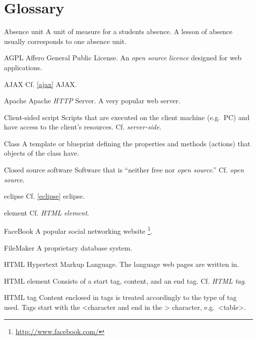 \documentclass[12pt,a4paper,twoside,openany]{report}
\begin{document}
\chapter{Glossary}
\label{glossary}
\begin{basedescript}{}

\item[Absence unit] A unit of measure for a students absence. A lesson of
absence usually corresponds to one absence unit.

\item[AGPL] Affero General Public License. An \textit{open source licence}
designed for web applications.

\item[AJAX] Cf. \ref{ajax} AJAX.

\item[Apache] Apache \textit{HTTP} Server. A very popular web server.

\item[Client-sided script] Scripts that are executed on the
client machine (e.g.\ PC) and have access to the client's resources. Cf.
\textit{server-side}.

\item[Class] A template or blueprint defining the properties and methods
(actions) that objects of the class have.

\item[Closed source software] Software that is ``neither free nor \textit{open
source}.''\cite{closed_source_wiki} Cf. \textit{open source}.

\item[eclipse] Cf. \ref{eclipse} eclipse.

\item[element] Cf. \textit{HTML element}.

\item[FaceBook] A popular social networking website
\footnote{\url{http://www.facebook.com/}}.

\item[FileMaker] A proprietary database system.

\item[HTML] Hypertext Markup Language. The language web pages
are written in.

\item[HTML element] Consists of a start tag, content, and an end tag. Cf.
\textit{HTML tag}.

\item[HTML tag] Content enclosed in tags is treated accordingly to the type of
tag used. Tags start with the \textless character and end in the \textgreater
character, e.g.\ \textless{}table\textgreater.


\end{basedescript}
\end{document}
